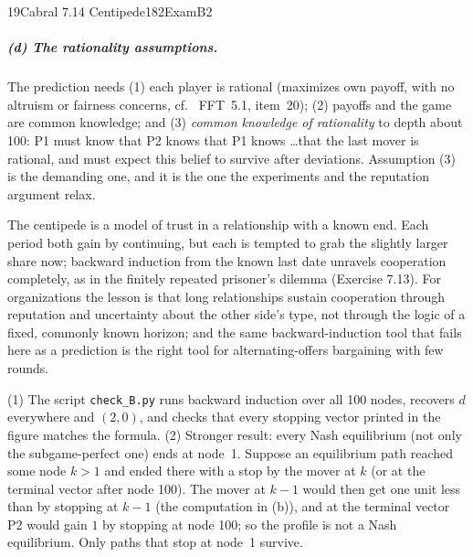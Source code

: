 \begin{exsol}{19}{Cabral 7.14 Centipede}{182}{Exam}{B2}
\subparagraph{(d) The rationality assumptions.} The prediction needs (1) each player is rational
(maximizes own payoff, with no altruism or fairness concerns, cf.\ \MR{} FFT~5.1, item~20);
(2) payoffs and the game are common knowledge; and (3) \emph{common knowledge of rationality} to
depth about 100: P1 must know that P2 knows that P1 knows \dots that the last mover is rational,
and must expect this belief to survive after deviations. Assumption (3) is the demanding one,
and it is the one the experiments and the reputation argument relax.

\interp The centipede is a model of trust in a relationship with a known end. Each period both
gain by continuing, but each is tempted to grab the slightly larger share now; backward
induction from the known last date unravels cooperation completely, as in the finitely repeated
prisoner's dilemma (Exercise 7.13). For organizations the lesson is that long relationships
sustain cooperation through reputation and uncertainty about the other side's type, not through
the logic of a fixed, commonly known horizon; and the same backward-induction tool that fails
here as a prediction is the right tool for alternating-offers bargaining with few rounds.

\verify (1) The script \texttt{check\_B.py} runs backward induction over all 100 nodes, recovers
$d$ everywhere and $(2,0)$, and checks that every stopping vector printed in the figure matches
the formula. (2) Stronger result: every Nash equilibrium (not only the subgame-perfect one)
ends at node~1. Suppose an equilibrium path reached some node $k>1$ and ended there with a stop
by the mover at $k$ (or at the terminal vector after node 100). The mover at $k-1$ would then
get one unit less than by stopping at $k-1$ (the computation in (b)), and at the terminal vector
P2 would gain $1$ by stopping at node 100; so the profile is not a Nash equilibrium. Only paths
that stop at node~1 survive.

\end{exsol}
